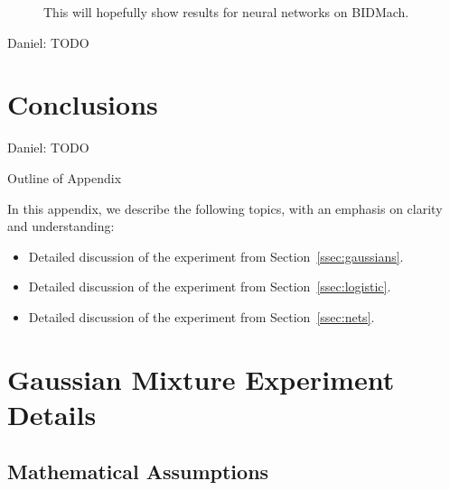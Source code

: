 \documentclass{article}
\begin{document}
\begin{figure}[ht]
  \centering
  \fbox{\rule[-.5cm]{0cm}{4cm} \rule[-.5cm]{4cm}{0cm}}
  \caption{This will hopefully show results for neural networks on BIDMach.}
\end{figure}

{\color{blue}
Daniel: TODO
}




\section{Conclusions}\label{sec:conclusion}

{\color{blue}
Daniel: TODO
}


\small



\clearpage
\appendix

\begin{center}
{\Large Outline of Appendix}
\end{center}

In this appendix, we describe the following topics, with an emphasis on clarity and understanding:

\begin{itemize}[noitemsep]
    \item Detailed discussion of the experiment from Section~\ref{ssec:gaussians}.
    \item Detailed discussion of the experiment from Section~\ref{ssec:logistic}.
    \item Detailed discussion of the experiment from Section~\ref{ssec:nets}.
\end{itemize}

\section{Gaussian Mixture Experiment Details}

\subsection{Mathematical Assumptions}
\end{document}
